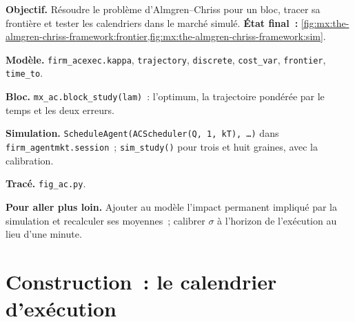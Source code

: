 \begin{tutorial}
\textbf{Objectif.} Résoudre le problème d'Almgren--Chriss pour un bloc, tracer sa frontière et tester les calendriers dans le marché simulé.
\textbf{État final~:} \cref{fig:mx:the-almgren-chriss-framework:frontier,fig:mx:the-almgren-chriss-framework:sim}.
\begin{tutsteps}
\item \textbf{Modèle.} \texttt{firm\_acexec.kappa}, \texttt{trajectory}, \texttt{discrete}, \texttt{cost\_var}, \texttt{frontier}, \texttt{time\_to}.
\item \textbf{Bloc.} \texttt{mx\_ac.block\_study(lam)}~: l'optimum, la trajectoire pondérée par le temps et les deux erreurs.
\item \textbf{Simulation.} \texttt{ScheduleAgent(ACScheduler(Q, 1, kT), \dots)} dans \texttt{firm\_agentmkt.session}~; \texttt{sim\_study()} pour trois
 et huit graines, avec la calibration.
\item \textbf{Tracé.} \texttt{fig\_ac.py}.
\end{tutsteps}
\textbf{Pour aller plus loin.} Ajouter au modèle l'impact permanent impliqué par la simulation et recalculer ses moyennes~; calibrer $\sigma$ à
l'horizon de l'exécution au lieu d'une minute.
\end{tutorial}

\section{Construction~: le calendrier d'exécution}\label{bld:mx:the-almgren-chriss-framework:acexec}

